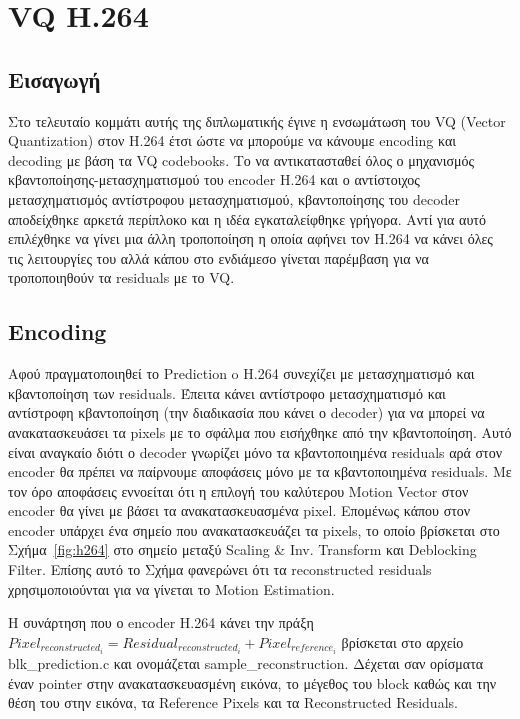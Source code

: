 ﻿\chapter{VQ H.264}
\label{chapter:chap5}

\section{Εισαγωγή}
\label{section:sect51}

\indent Στο τελευταίο κομμάτι αυτής της διπλωματικής έγινε η ενσωμάτωση του VQ (Vector Quantization) στον H.264 έτσι ώστε να μπορούμε να κάνουμε encoding και decoding με βάση τα VQ codebooks. Το να αντικατασταθεί όλος ο μηχανισμός κβαντοποίησης-μετασχηματισμού του encoder H.264 και ο αντίστοιχος μετασχηματισμός αντίστροφου μετασχηματισμού, κβαντοποίησης του decoder αποδείχθηκε αρκετά περίπλοκο και η ιδέα εγκαταλείφθηκε γρήγορα. Αντί για αυτό επιλέχθηκε να γίνει μια άλλη τροποποίηση η οποία αφήνει τον H.264 να κάνει όλες τις λειτουργίες του αλλά κάπου στο ενδιάμεσο γίνεται παρέμβαση  για να τροποποιηθούν τα residuals με το VQ.

\section{Encoding}
\label{section:sect52}

\indent Αφού πραγματοποιηθεί το Prediction o H.264 συνεχίζει με μετασχηματισμό και κβαντοποίηση των residuals. Έπειτα κάνει αντίστροφο μετασχηματισμό και αντίστροφη κβαντοποίηση (την διαδικασία που κάνει ο decoder) για να μπορεί να ανακατασκευάσει τα pixels με το σφάλμα που εισήχθηκε από την κβαντοποίηση. Αυτό είναι αναγκαίο διότι ο decoder γνωρίζει μόνο τα κβαντοποιημένα residuals αρά στον encoder θα πρέπει να παίρνουμε αποφάσεις μόνο με τα κβαντοποιημένα residuals. Με τον όρο αποφάσεις εννοείται ότι η επιλογή του καλύτερου Motion Vector στον encoder θα γίνει με βάσει τα ανακατασκευασμένα pixel. Επομένως κάπου στον encoder υπάρχει ένα σημείο που ανακατασκευάζει τα pixels, το οποίο βρίσκεται στο Σχήμα~\ref{fig:h264} στο σημείο μεταξύ Scaling \& Inv. Transform και Deblocking Filter. Επίσης αυτό το Σχήμα φανερώνει ότι τα reconstructed residuals χρησιμοποιούνται για να γίνεται το Motion Estimation.

\indent Η συνάρτηση που ο encoder Η.264 κάνει την πράξη $ Pixel_{reconstructed_i} = Residual_{reconstructed_i} + Pixel_{reference_i} $ βρίσκεται στο αρχείο blk\_prediction.c και ονομάζεται sample\_reconstruction. Δέχεται σαν ορίσματα έναν pointer στην ανακατασκευασμένη εικόνα, το μέγεθος του block καθώς και την θέση του στην εικόνα, τα Reference Pixels και τα Reconstructed Residuals.

